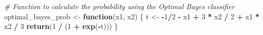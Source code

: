\documentclass[
]{article}
\newenvironment{Shaded}{\begin{snugshade}}{\end{snugshade}}
\newcommand{\CommentTok}[1]{\textcolor[rgb]{0.56,0.35,0.01}{\textit{#1}}}
\newcommand{\ControlFlowTok}[1]{\textcolor[rgb]{0.13,0.29,0.53}{\textbf{#1}}}
\newcommand{\DecValTok}[1]{\textcolor[rgb]{0.00,0.00,0.81}{#1}}
\newcommand{\FunctionTok}[1]{\textcolor[rgb]{0.13,0.29,0.53}{\textbf{#1}}}
\newcommand{\NormalTok}[1]{#1}
\newcommand{\OtherTok}[1]{\textcolor[rgb]{0.56,0.35,0.01}{#1}}
\newcommand{\SpecialCharTok}[1]{\textcolor[rgb]{0.81,0.36,0.00}{\textbf{#1}}}
\begin{document}
\begin{Shaded}
\begin{Highlighting}[]
\CommentTok{\# Function to calculate the probability using the Optimal Bayes classifier}
\NormalTok{optimal\_bayes\_prob }\OtherTok{\textless{}{-}} \ControlFlowTok{function}\NormalTok{(x1, x2) \{}
\NormalTok{  t }\OtherTok{\textless{}{-}} \SpecialCharTok{{-}}\DecValTok{1}\SpecialCharTok{/}\DecValTok{2} \SpecialCharTok{{-}}\NormalTok{ x1 }\SpecialCharTok{+} \DecValTok{3} \SpecialCharTok{*}\NormalTok{ x2 }\SpecialCharTok{/} \DecValTok{2} \SpecialCharTok{+}\NormalTok{ x1 }\SpecialCharTok{*}\NormalTok{ x2 }\SpecialCharTok{/} \DecValTok{3}
  \FunctionTok{return}\NormalTok{(}\DecValTok{1} \SpecialCharTok{/}\NormalTok{ (}\DecValTok{1} \SpecialCharTok{+} \FunctionTok{exp}\NormalTok{(}\SpecialCharTok{{-}}\NormalTok{t)))}
\NormalTok{\}}
\end{Highlighting}
\end{Shaded}
\end{document}
